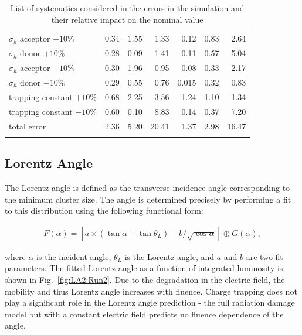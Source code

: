 \begin{table}[!htpb]
\begin{center}
{\begin{tabular*}{0.7\textwidth}{@{\extracolsep{\fill}}lrrrrrr}
$\sigma_h$ acceptor $+10\%$  	& 0.34  	& 1.55  & 1.33 & 0.12 & 0.83  & 2.64\\
$\sigma_h$  donor $+10\%$  		& 0.28  	& 0.09  & 1.41 & 0.11 & 0.57  &5.04\\
$\sigma_h$  acceptor $-10\%$  	& 0.30  	& 1.96  & 0.95 & 0.08 & 0.33  &2.17\\
$\sigma_h$  donor $-10\%$ 			& 0.29  	& 0.55  & 0.76 & 0.015  & 0.32  &0.83 \\
\noalign{\smallskip}\hline\noalign{\smallskip}
trapping constant $+10\%$ 			& 0.68  	& 2.25  & 3.56 & 1.24 & 1.10 & 1.34 \\
trapping constant $-10\%$  			& 0.60  	& 0.10  & 8.83 & 0.14 & 0.37 &  7.20\\
\noalign{\smallskip}\hline\noalign{\smallskip}
total error 					& 2.36		& 5.20 & 20.41 & 1.37 & 2.98  &16.47\\
\noalign{\smallskip}\hline\noalign{\smallskip}
\end{tabular*}
   \caption{List of systematics considered in the errors in the simulation and their relative impact on the nominal value}
   \label{tab:SystError}
}
\end{center}

\end{table} 


\subsection{Lorentz Angle}
\label{sec:lorentzangle}

The Lorentz angle is defined as the transverse incidence angle corresponding to the minimum cluster size.  The angle is determined precisely by performing a fit to this distribution using the following functional form:

\begin{align}
F(\alpha)=[a\times(\tan\alpha-\tan\theta_L)+b/\sqrt{\cos\alpha}]\oplus G(\alpha),
\end{align}

where $\alpha$ is the incident angle, $\theta_L$ is the Lorentz angle, and $a$ and $b$ are two fit parameters.  The fitted Lorentz angle as a function of integrated luminosity is shown in Fig.~\ref{fig:LA2:Run2}.  Due to the degradation in the electric field, the mobility and thus Lorentz angle increases with fluence.  Charge trapping does not play a significant role in the Lorentz angle prediction - the full radiation damage model but with a constant electric field predicts no fluence dependence of the angle.

